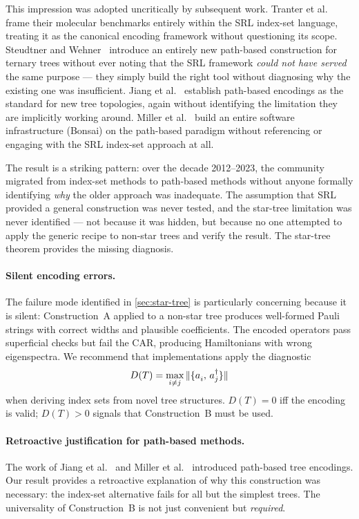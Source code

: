 This impression was adopted uncritically by subsequent work.
Tranter et al.~\cite{tranter2015} frame their molecular benchmarks
entirely within the SRL index-set language, treating it as the
canonical encoding framework without questioning its scope.
Steudtner and Wehner~\cite{steudtner2018} introduce an entirely
new path-based construction for ternary trees without ever noting
that the SRL framework \emph{could not have served} the same
purpose --- they simply build the right tool without diagnosing
why the existing one was insufficient.
Jiang et al.~\cite{jiang2020} establish path-based encodings as
the standard for new tree topologies, again without identifying
the limitation they are implicitly working around.
Miller et al.~\cite{miller2023bonsai} build an entire software
infrastructure (Bonsai) on the path-based paradigm without
referencing or engaging with the SRL index-set approach at all.

The result is a striking pattern: over the decade 2012--2023, the
community migrated from index-set methods to path-based methods
without anyone formally identifying \emph{why} the older approach
was inadequate.  The assumption that SRL provided a general
construction was never tested, and the star-tree limitation was
never identified --- not because it was hidden, but because no one
attempted to apply the generic recipe to non-star trees and verify
the result.  The star-tree theorem provides the missing diagnosis.

\paragraph{Silent encoding errors.}
The failure mode identified in \cref{sec:star-tree} is particularly
concerning because it is silent: Construction~A applied to a non-star
tree produces well-formed Pauli strings with correct widths and
plausible coefficients.  The encoded operators pass superficial checks
but fail the CAR, producing Hamiltonians with wrong eigenspectra.
We recommend that implementations apply the diagnostic
\begin{equation}
  D(T) = \max_{i \neq j}
    \|\acomm{\an{i}}{\ad{j}}\|
  \label{eq:diagnostic}
\end{equation}
when deriving index sets from novel tree structures.  $D(T) = 0$ iff
the encoding is valid; $D(T) > 0$ signals that Construction~B must
be used.

\paragraph{Retroactive justification for path-based methods.}
The work of Jiang et al.~\cite{jiang2020} and Miller et
al.~\cite{miller2023bonsai} introduced path-based tree encodings.
Our result provides a retroactive explanation of why this
construction was necessary: the index-set alternative fails for all
but the simplest trees.  The universality of Construction~B is not
just convenient but \emph{required}.

